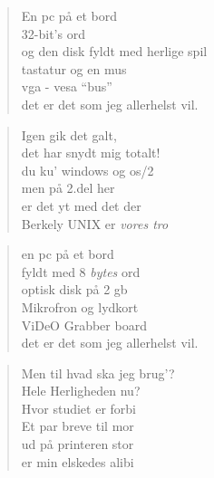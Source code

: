 \documentclass[a4paper,11pt]{article}
\begin{document}
\begin{sketch}
\begin{verse}
En pc på et bord\\
32-bit's ord\\
og den disk fyldt med herlige spil\\
tastatur og en mus\\
vga - vesa ``bus''\\
det er det som jeg allerhelst vil.\\
\end{verse}

\begin{verse}
	Igen gik det galt,\\
	det har snydt mig totalt!\\
	du ku' windows og {\sc os}/2\\
	men på 2.del her\\
	er det yt med det der\\
	Berkely UNIX  er {\em vores tro}\\
\end{verse}

\begin{verse}
en pc på et bord\\
fyldt med 8 {\em bytes}\/ ord\\
optisk disk på 2 {\sc gb}\\
Mikrofron og lydkort\\
ViDeO Grabber {\sc board}\\
det er det som jeg allerhelst vil.\\
\end{verse}

\begin{verse}
	Men til hvad ska jeg brug'?\\
	Hele Herligheden nu?\\
	Hvor studiet er forbi\\
	Et par breve til mor\\
	ud på printeren stor\\
	er min elskedes alibi\\
\end{verse}


\end{sketch}
\end{document}
